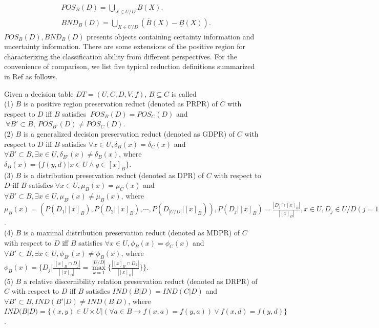 \documentclass[review]{elsarticle}
\begin{document}
		\begin{equation*}\begin{split}
			&POS_B(D) = \bigcup_{X \in U/D}\underline{B}(X).\\
			&BND_B(D)=\bigcup_{X \in U/D} (\overline{B}(X)-\underline{B}(X)).
		\end{split}\end{equation*}
	$POS_B(D), BND_B(D)$ presents objects containing certainty information and uncertainty information. There are some extensions of the positive region for characterizing the classification ability from different perspectives. For the convenience of comparison, we list five typical reduction definitions summarized in Ref \cite{zhou2011analysis} as follows.
	\par Given a decision table $DT=(U,C,D,V,f)$, $B \subseteq C$ is called\\
	\rm{(1)} $B$ is a positive region preservation reduct (denoted as PRPR) of $C$ with respect to $D$ iff $B$ satisfies $\ POS_B(D)=POS_C(D)$ and $\ \forall B' \subset B,\ POS_{B'}(D) \neq POS_{C}(D)$.\\
	\rm{(2)} $B$ is a generalized decision preservation reduct (denoted as GDPR) of $C$ with respect to $D$ iff $B$ satisfies $\forall x\in U, \delta_{B}(x)=\delta_{C}(x)$ and $\forall B' \subset B, \exists x \in U, \delta_{B'}(x) \neq \delta_{B}(x)$, where $\delta_{B}(x)=\{f(y,d)| x \in U \wedge y \in [x]_B\}$.\\
	\rm{(3)} $B$ is a distribution preservation reduct (denoted as DPR) of $C$ with respect to $D$ iff $B$ satisfies $ \forall x\in U, \mu_{B}(x)=\mu_{C}(x)$ and $\forall B' \subset B, \exists x \in U, \mu_{B'}(x) \neq \mu_{B}(x)$, where $\mu_{B}(x)=(P(D_1|[x]_B),P(D_2|[x]_B),\cdots,P(D_{|U/D|}|[x]_B)),P(D_j|[x]_B)=\frac{|D_j \cap [x]_B|}{|[x]_B|}, x \in U, D_j \in U/D(j=1,2,\cdots,|U/D|)$.\\
	\rm{(4)} $B$ is a maximal distribution preservation reduct (denoted as MDPR) of $C$ with respect to $D$ iff $B$ satisfies $\forall x \in U, \phi_{B}(x)=\phi_{C}(x)$ and $\forall B' \subset B, \exists x \in U, \phi_{B'}(x) \neq \phi_{B}(x)$, where $\phi_{B}(x)=\{D_{j}|\frac{|[x]_B \cap D_{j}|}{|[x]_{B}|}=\max\limits_{k=1}^{|U/D|}\{\frac{|[x]_B \cap D_{k}|}{|[x]_{B}|}\}\}$.\\
	\rm{(5)} $B$ a relative discernibility relation preservation reduct (denoted as DRPR) of $C$ with respect to $D$ iff $B$ satisfies
	$IND(B|D)=IND(C|D)$ and $\forall B' \subset B, IND(B'|D) \neq IND(B|D)$, where $IND(B|D)=\{(x,y)\in U \times U| (\forall a \in B \rightarrow f(x,a)=f(y,a)) \vee f(x,d)=f(y,d)\}$. 
\end{document}
